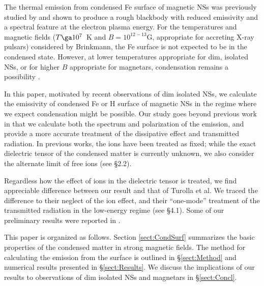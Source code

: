 \documentclass{emulateapj}
\begin{document}
The thermal emission from condensed Fe surface of magnetic NSs
was previously studied by \citet{Brinkmann}
\citep[see also][]{Itoh,LenzenTruemper}
and shown to produce a rough blackbody
with reduced emissivity and a spectral feature at the electron plasma energy.
For the temperatures and magnetic fields ($T\ga 10^7$~K and 
$B=10^{12-13}$G, appropriate for accreting X-ray pulsars) 
considered by Brinkmann, the Fe surface is not expected to be in the 
condensed state. However, at lower temperatures appropriate for dim,
isolated NSs, or for higher $B$ appropriate for magnetars,
condensation remains a possibility \citep[see][]{Lai01}.
 
In this paper, motivated by recent observations of dim isolated NSs, 
we calculate the emissivity of condensed Fe or H surface of 
magnetic NSs in the regime where we expect condensation might be 
possible. Our study goes beyond previous work \citep{Brinkmann,Turolla-ea}
in that we calculate both the 
spectrum and polarization of the emission, and provide a more accurate treatment 
of the dissipative effect and transmitted radiation.  In previous works, the ions 
have been treated as fixed; while the exact dielectric tensor of the condensed 
matter is currently unknown, we also consider the alternate limit of free ions 
(see \S 2.2).


Regardless how the effect of ions in the dielectric tensor is treated,
we find appreciable difference between our result and that of 
Turolla et al. We traced the difference to their neglect of the 
ion effect, and their ``one-mode'' treatment of the transmitted 
radiation in the low-energy regime (see \S 4.1). Some of our preliminary 
results were reported in \citet{ArrasLai}.

This paper is organized as follows. Section \ref{sect:CondSurf} 
summarizes the basic 
properties of the condensed matter in strong magnetic fields.
The method for calculating the emission from the surface is
outlined in \S\ref{sect:Method} and numerical results 
presented in \S\ref{sect:Results}.
We discuss the implications of our results to observations of
dim isolated NSs and magnetars in \S\ref{sect:Concl}.
\end{document}
